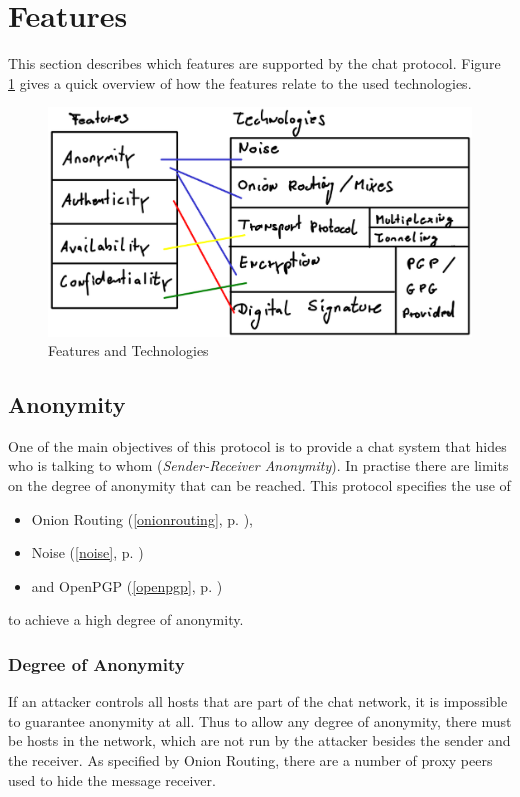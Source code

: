 \section{Features}
\label{protofeatures}
This section describes which features are supported by the chat protocol.
Figure \ref{features-technologies} gives a quick overview of how the
features relate to the used technologies.
\begin{figure}
    \centering
    \caption{Features and Technologies}
    \label{features-technologies}
    \includegraphics[scale=0.8]{features-technologies.eps}
\end{figure}
\subsection{Anonymity}
\label{featanonymity}
One of the main objectives of this protocol is to provide a chat system that
hides who is talking to whom (\textit{Sender-Receiver Anonymity}). 
In practise there are limits on the degree of anonymity that can be reached.
This protocol specifies the use of
\begin{itemize}
\item Onion Routing (\ref{onionrouting}, p. \pageref{onionrouting}),
\item Noise (\ref{noise}, p. \pageref{noise})
\item and OpenPGP (\ref{openpgp}, p. \pageref{openpgp})
\end{itemize}
to achieve a high degree of anonymity.
\subsubsection{Degree of Anonymity}
\label{degreeofanonymity}
If an attacker controls all hosts that are part of the chat network, 
it is impossible to guarantee anonymity at all.
Thus to allow any degree of anonymity, there must be hosts in the network,
which are not run by the attacker besides the sender and the receiver.
As specified by Onion Routing, there are a number of proxy peers used
to hide the message receiver.

